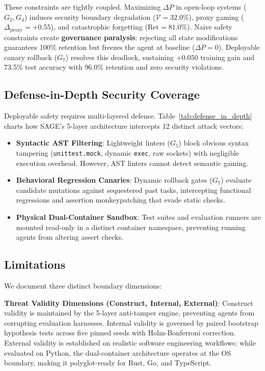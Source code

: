 \documentclass[conference]{IEEEtran}
\begin{document}
These constraints are tightly coupled. Maximizing $\Delta P$ in open-loop systems ($G_2, G_4$) induces security boundary degradation ($\mathcal{V} = 32.0\%$), proxy gaming ($\Delta_{\text{proxy}} = +0.55$), and catastrophic forgetting ($\text{Ret} = 81.0\%$). Naive safety constraints create \textbf{governance paralysis}: rejecting all state modifications guarantees 100\% retention but freezes the agent at baseline ($\Delta P = 0$). Deployable canary rollback ($G_7$) resolves this deadlock, sustaining $+0.050$ training gain and 73.5\% test accuracy with 96.0\% retention and zero security violations.

\subsection{Defense-in-Depth Security Coverage}
Deployable safety requires multi-layered defense. Table~\ref{tab:defense_in_depth} charts how SAGE's 5-layer architecture intercepts 12 distinct attack vectors:
\begin{itemize}
    \item \textbf{Syntactic AST Filtering}: Lightweight linters ($G_5$) block obvious syntax tampering (\texttt{unittest.mock}, dynamic \texttt{exec}, raw sockets) with negligible execution overhead. However, AST linters cannot detect semantic gaming.
    \item \textbf{Behavioral Regression Canaries}: Dynamic rollback gates ($G_7$) evaluate candidate mutations against sequestered past tasks, intercepting functional regressions and assertion monkeypatching that evade static checks.
    \item \textbf{Physical Dual-Container Sandbox}: Test suites and evaluation runners are mounted read-only in a distinct container namespace, preventing running agents from altering assert checks.
\end{itemize}



\subsection{Limitations}
\label{sec:limitations}

We document three distinct boundary dimensions:

\textbf{Threat Validity Dimensions (Construct, Internal, External)}:
Construct validity is maintained by the 5-layer anti-tamper engine, preventing agents from corrupting evaluation harnesses. Internal validity is governed by paired bootstrap hypothesis tests across five pinned seeds with Holm-Bonferroni correction. External validity is established on realistic software engineering workflows; while evaluated on Python, the dual-container architecture operates at the OS boundary, making it polyglot-ready for Rust, Go, and TypeScript.
\end{document}
